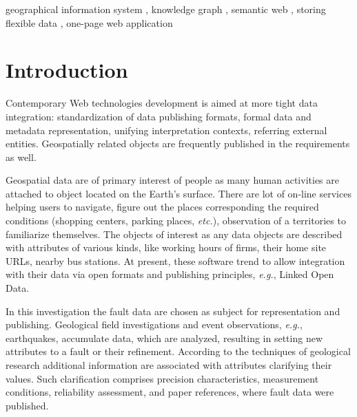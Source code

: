 \documentclass[
]{ceurart}
\begin{document}
\begin{keywords}
  geographical information system \sep
  knowledge graph \sep
  semantic web \sep
  storing flexible data \sep
  one-page web application
\end{keywords}

\maketitle

\section{Introduction}

Contemporary Web technologies development is aimed at more tight data integration: standardization of data publishing formats, formal data and metadata representation, unifying interpretation contexts, referring external entities.  Geospatially related objects are frequently published in the requirements as well.

Geospatial data are of primary interest of people as many human activities are attached to object located on the Earth's surface.  There are lot of on-line services helping users to navigate, figure out the places corresponding the required conditions (shopping centers, parking places, \emph{etc.}), observation of a territories to familiarize themselves.  The objects of interest as any data objects are described with attributes of various kinds, like working hours of firms, their home site URLs, nearby bus stations.  At present, these software trend to allow integration with their data via open formats and publishing principles, \emph{e.g.}, Linked Open Data.

In this investigation the fault data are chosen as subject for representation and publishing.  Geological field investigations and event observations, \emph{e.g.}, earthquakes, accumulate data, which are analyzed, resulting in setting new attributes to a fault or their refinement.  According to the techniques of geological research additional information are associated with attributes clarifying their values.  Such clarification comprises precision characteristics, measurement conditions, reliability assessment, and paper references, where fault data were published.
\end{document}
